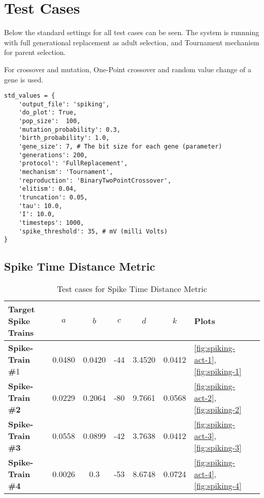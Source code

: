 \section{Test Cases}


Below the standard settings for all test cases can be seen. The system is runnning
with full generational replacement as adult selection, and Tournament mechanism for
parent selection.

For crossover and mutation, One-Point crossover and random value change of a gene is used. 

\begin{lstlisting}[frame=single,caption={Default values for all params}] 
std_values = {
    'output_file': 'spiking',
    'do_plot': True,
    'pop_size':  100,
    'mutation_probability': 0.3,
    'birth_probability': 1.0,
    'gene_size': 7, # The bit size for each gene (parameter)
    'generations': 200,
    'protocol': 'FullReplacement',
    'mechanism': 'Tournament',
    'reproduction': 'BinaryTwoPointCrossover',
    'elitism': 0.04,
    'truncation': 0.05,
    'tau': 10.0,
    'I': 10.0,
    'timesteps': 1000,
    'spike_threshold': 35, # mV (milli Volts)
}
\end{lstlisting}

\subsection{Spike Time Distance Metric}

\begin{table}[H]
	\begin{center}
		\begin{tabular}{ | l | c | c | c | c | c | l | l |}
	
	    \hline

			\textbf{Target Spike Trains} & \textbf{$a$} & \textbf{$b$} & \textbf{$c$} & \textbf{$d$} & \textbf{$k$} & \textbf{Plots}  \\ \hline 
			\textbf{Spike-Train \#}1 & 0.0480 & 0.0420 & -44 & 3.4520 & 0.0412 & \autoref{fig:spiking-act-1}, \autoref{fig:spiking-1} \\ \hline 
			\textbf{Spike-Train \#2} & 0.0229 & 0.2064 & -80 & 9.7661 & 0.0568 & \autoref{fig:spiking-act-2}, \autoref{fig:spiking-2} \\ \hline 
			\textbf{Spike-Train \#3} & 0.0558 & 0.0899 & -42 & 3.7638 & 0.0412 & \autoref{fig:spiking-act-3}, \autoref{fig:spiking-3} \\ \hline 
			\textbf{Spike-Train \#4} & 0.0026 & 0.3 & -53 & 8.6748 & 0.0724 & \autoref{fig:spiking-act-4}, \autoref{fig:spiking-4}    \\ \hline 

	    \end{tabular}
	
	\end{center}
    \caption{Test cases for Spike Time Distance Metric}
\end{table}

